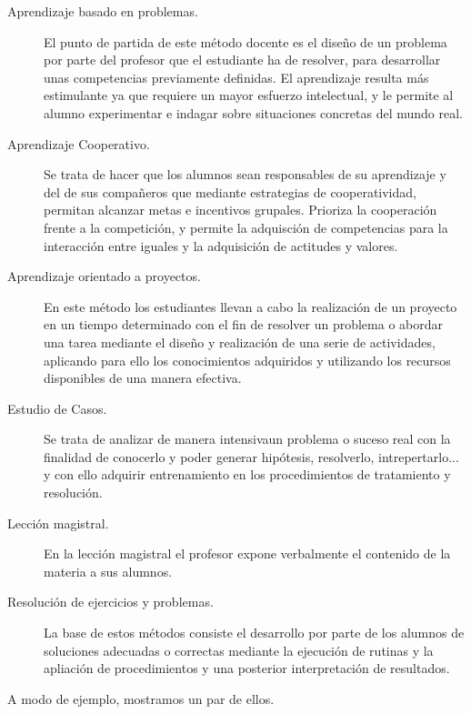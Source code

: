 \begin{description}
		\begin{description}
			\item [Aprendizaje basado en problemas.] El punto de partida de este método docente es el diseño de un problema por parte del profesor que el estudiante ha de resolver, para desarrollar unas competencias previamente definidas. El aprendizaje resulta más estimulante ya que requiere un mayor esfuerzo intelectual, y le permite al alumno experimentar e indagar sobre situaciones concretas del mundo real.
			\item [Aprendizaje Cooperativo.] Se trata de hacer que los alumnos sean responsables de su aprendizaje y del de sus compañeros que mediante estrategias de cooperatividad, permitan alcanzar metas e incentivos grupales. Prioriza la cooperación frente a la competición, y permite la adquisción de competencias para la interacción entre iguales y la adquisición de actitudes y valores.
			\item [Aprendizaje orientado a proyectos.] En este método los estudiantes llevan a cabo la realización de un proyecto en un tiempo determinado con el fin de resolver un problema o abordar una tarea mediante el diseño y realización de una serie de actividades, aplicando para ello los conocimientos adquiridos y utilizando los recursos disponibles de una manera efectiva.
			\item [Estudio de Casos.] Se trata de analizar de manera intensivaun problema o suceso real con la finalidad de conocerlo y poder generar hipótesis, resolverlo, intrepertarlo...  y con ello adquirir entrenamiento en los procedimientos de tratamiento y resolución.
			\item [Lección magistral.] En la lección magistral el profesor expone verbalmente el contenido de la materia a sus alumnos.
			\item [Resolución de ejercicios y problemas.] La base de estos métodos consiste el desarrollo por parte de los alumnos de soluciones adecuadas o correctas mediante la ejecución de rutinas y la apliación de procedimientos y una posterior interpretación de resultados.
		\end{description}

		A modo de ejemplo, mostramos un par de ellos.
    
		 
  		 
  

\end{description}
